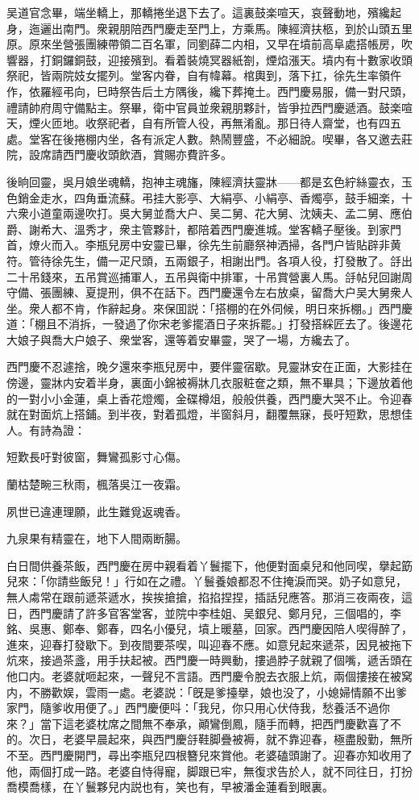 吴道官念畢，端坐轎上，那轎捲坐退下去了。這裏鼓楽喧天，哀聲動地，殯纔起身，迤邐出南門。衆親朋陪西門慶走至門上，方乘馬。陳經濟扶柩，到於山頭五里原。原來坐營張團練帶領二百名軍，同劉薛二内相，又早在墳前高阜處搭帳房，吹響器，打銅鑼銅鼓，迎接殯到。看着裝燒冥器紙劄，煙焰漲天。墳内有十數家收頭祭祀，皆兩院妓女擺列。堂客内眷，自有幃幕。棺輿到，落下扛，徐先生率領仵作，依羅經弔向，巳時祭告后土方隅後，纔下葬掩土。西門慶易服，備一對尺頭，禮請帥府周守備點主。祭畢，衛中官員並衆親朋夥計，皆爭拉西門慶遞酒。鼓楽喧天，煙火匝地。收祭祀者，自有所管人役，再無淆亂。那日待人齋堂，也有四五處。堂客在後捲棚内坐，各有派定人數。熱鬧豐盛，不必細說。喫畢，各又邀去莊院，設席請西門慶收頭飲酒，賞賜亦費許多。

後晌回靈，吳月娘坐魂轎，抱神主魂旛，陳經濟扶靈牀——都是玄色紵絲靈衣，玉色銷金走水，四角垂流蘇。弔挂大影亭、大絹亭、小絹亭、香燭亭，鼓手細楽，十六衆小道童兩邊吹打。吳大舅並喬大户、吴二舅、花大舅、沈姨夫、孟二舅、應伯爵、謝希大、溫秀才，衆主管夥計，都陪着西門慶進城。堂客轎子壓後。到家門首，燎火而入。李瓶兒房中安靈已畢，徐先生前廳祭神洒掃，各門户皆貼辟非黄符。管待徐先生，備一疋尺頭，五兩銀子，相謝出門。各項人役，打發散了。㧱出二十吊錢來，五吊賞巡捕軍人，五吊與衛中排軍，十吊賞營裏人馬。㧱帖兒回謝周守備、張團練、夏提刑，俱不在話下。西門慶還令左右放桌，留喬大户吴大舅衆人坐。衆人都不肯，作辭起身。來保囬説：「搭棚的在外伺候，明日來拆棚。」西門慶道：「棚且不消拆，一發過了你宋老爹擺酒日子來拆罷。」打發搭綵匠去了。後邊花大娘子與喬大户娘子、衆堂客，還等着安畢靈，哭了一場，方纔去了。

西門慶不忍遽捨，晚夕還來李瓶兒房中，要伴靈宿歇。見靈牀安在正面，大影挂在傍邊，靈牀内安着半身，裏面小錦被褥牀几衣服粧奩之類，無不畢具；下邊放着他的一對小小金蓮，桌上香花燈燭，金碟樽俎，般般供養，西門慶大哭不止。令迎春就在對面炕上搭鋪。到半夜，對着孤燈，半窗斜月，翻覆無寐，長吁短歎，思想佳人。有詩為證：

短歎長吁對彼窗，舞鸞孤影寸心傷。

蘭枯楚畹三秋雨，楓落吳江一夜霜。

夙世已違連理願，此生難覓返魂香。

九泉果有精靈在，地下人間兩断腸。

白日間供養茶飯，西門慶在房中親看着丫鬟擺下，他便對面桌兒和他同喫，擧起筯兒來：「你請些飯兒！」行如在之禮。丫鬟養娘都忍不住掩淚而哭。奶子如意兒，無人䖏常在跟前遞茶遞水，挨挨搶搶，掐掐捏捏，插話兒應答。那消三夜兩夜，這日，西門慶請了許多官客堂客，並院中李桂姐、吴銀兒、鄭月兒，三個唱的，李銘、吳惠、鄭奉、鄭春，四名小優兒，墳上暖墓，回家。西門慶因陪人喫得醉了，進來，迎春打發歇下。到夜間要茶喫，叫迎春不應。如意兒起來遞茶，因見被拖下炕來，接過茶盞，用手扶起被。西門慶一時興動，摟過脖子就親了個嘴，遞舌頭在他口内。老婆就咂起來，一聲兒不言語。西門慶令脫去衣服上炕，兩個摟接在被窝内，不勝歡娱，雲雨一處。老婆説：「旣是爹擡擧，娘也没了，小媳婦情願不出爹家門，隨爹收用便了。」西門慶便呌：「我兒，你只用心伏侍我，愁養活不過你來？」當下這老婆枕席之間無不奉承，顚鸞倒鳳，隨手而轉，把西門慶歡喜了不的。次日，老婆早晨起來，與西門慶㧱鞋脚疊被褥，就不靠迎春，極盡殷勤，無所不至。西門慶開門，尋出李瓶兒四根簪兒來賞他。老婆磕頭謝了。迎春亦知收用了他，兩個打成一路。老婆自恃得寵，脚跟已牢，無復求告於人，就不同往日，打扮喬模喬樣，在丫鬟夥兒内説也有，笑也有，早被潘金蓮看到眼裏。

